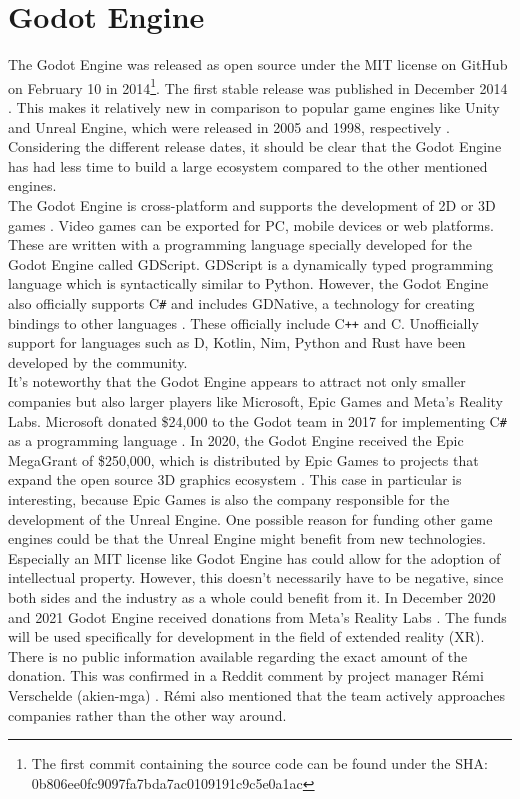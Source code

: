 \section{Godot Engine}
The Godot Engine was released as open source under the MIT license on GitHub on February 10 in 2014\footnote{The first commit containing the source code can be found under the SHA:\\ 0b806ee0fc9097fa7bda7ac0109191c9c5e0a1ac}\cite{godot-repository}.
The first stable release was published in December 2014 \cite{godot-release}.
This makes it relatively new in comparison to popular game engines like Unity and Unreal Engine, which were released in 2005 and 1998, respectively \cite{unity-release, unreal-release}.
Considering the different release dates, it should be clear that the Godot Engine has had less time to build a large ecosystem compared to the other mentioned engines.\\

The Godot Engine is cross-platform and supports the development of 2D or 3D games \cite{godot-engine}.
Video games can be exported for PC, mobile devices or web platforms.
These are written with a programming language specially developed for the Godot Engine called GDScript.
GDScript is a dynamically typed programming language which is syntactically similar to Python.
However, the Godot Engine also officially supports C\texttt{\#} and includes GDNative, a technology for creating bindings to other languages \cite{godot-gdnative}.
These officially include C\texttt{++} and C.
Unofficially support for languages such as D, Kotlin, Nim, Python and Rust have been developed by the community.\\

It's noteworthy that the Godot Engine appears to attract not only smaller companies but also larger players like Microsoft, Epic Games and Meta's Reality Labs.
Microsoft donated \$24,000 to the Godot team in 2017 for implementing C\texttt{\#} as a programming language \cite{godot-csharp}.
In 2020, the Godot Engine received the Epic MegaGrant of \$250,000, which is distributed by Epic Games to projects that expand the open source 3D graphics ecosystem \cite{godot-megagrant}.
This case in particular is interesting, because Epic Games is also the company responsible for the development of the Unreal Engine.
One possible reason for funding other game engines could be that the Unreal Engine might benefit from new technologies.
Especially an MIT license like Godot Engine has could allow for the adoption of intellectual property. 
However, this doesn't necessarily have to be negative, since both sides and the industry as a whole could benefit from it.
In December 2020 and 2021 Godot Engine received donations from Meta's Reality Labs \cite{godot-facebook-reality, godot-meta-reality}.
The funds will be used specifically for development in the field of extended reality (XR).
There is no public information available regarding the exact amount of the donation.
This was confirmed in a Reddit comment by project manager Rémi Verschelde (akien-mga) \cite{reddit-companies-akien}.
Rémi also mentioned that the team actively approaches companies rather than the other way around.
